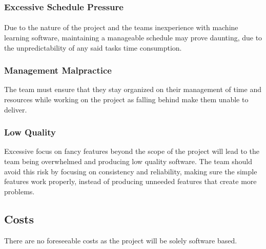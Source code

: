 \documentclass[12pt, titlepage]{article}
\begin{document}
\subsubsection{Excessive Schedule Pressure}
\paragraph{} Due to the nature of the project and the teams inexperience with machine learning software, maintaining a manageable schedule may prove daunting, due to the unpredictability of any said tasks time consumption.

\subsubsection{Management Malpractice}
The team must ensure that they stay organized on their management of time and resources while working on the project as falling behind make them unable to deliver.

\subsubsection{Low Quality}
Excessive focus on fancy features beyond the scope of the project will lead to the team being overwhelmed and producing low quality software. The team should avoid this risk by focusing on consistency and reliability, making sure the simple features work properly, instead of producing unneeded features that create more problems.


\subsection{Costs}
There are no foreseeable costs as the project will be solely software based.

% 
% 
\end{document}
